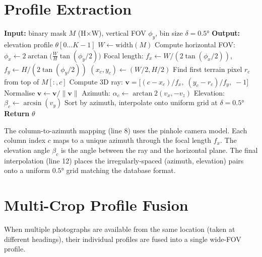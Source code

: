\section{Profile Extraction}

\begin{algorithm}[H]
\caption{Profile Extraction}
\label{alg:profile}
\begin{algorithmic}[1]
\State \textbf{Input:} binary mask $M$ (H$\times$W), vertical FOV $\phi_y$, bin size $\delta = 0.5°$
\State \textbf{Output:} elevation profile $\theta[0 \ldots K{-}1]$
\State $W \leftarrow \text{width}(M)$
\State Compute horizontal FOV: $\phi_x \leftarrow 2 \arctan\!\big(\tfrac{W}{H} \tan(\phi_y / 2)\big)$
\State Focal length: $f_x \leftarrow W / (2 \tan(\phi_x / 2))$, \; $f_y \leftarrow H / (2 \tan(\phi_y / 2))$
\State $(x_c, y_c) \leftarrow (W/2, H/2)$
    \State Find first terrain pixel $r_c$ from top of $M[:, c]$
    \State Compute 3D ray: $\mathbf{v} = \big[(c - x_c)/f_x,\; (y_c - r_c)/f_y,\; -1\big]$
    \State Normalise $\mathbf{v} \leftarrow \mathbf{v} / \|\mathbf{v}\|$
    \State Azimuth: $\alpha_c \leftarrow \arctan2(v_x, -v_z)$
    \State Elevation: $\beta_c \leftarrow \arcsin(v_y)$
\EndFor
\State Sort by azimuth, interpolate onto uniform grid at $\delta = 0.5°$
\State \textbf{Return} $\theta$
\end{algorithmic}
\end{algorithm}

\noindent The column-to-azimuth mapping (line 8) uses the pinhole camera model. Each column index $c$ maps to a unique azimuth through the focal length $f_x$. The elevation angle $\beta_c$ is the angle between the ray and the horizontal plane. The final interpolation (line 12) places the irregularly-spaced (azimuth, elevation) pairs onto a uniform $0.5°$ grid matching the database format.

\section{Multi-Crop Profile Fusion}

When multiple photographs are available from the same location (taken at different headings), their individual profiles are fused into a single wide-FOV profile.

